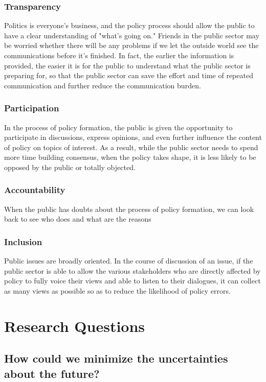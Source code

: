\documentclass{IEEEtran}
\begin{document}
\begin{enumerate}
\subsubsection{Transparency}
Politics is everyone's business, and the policy process should allow the public to have a clear understanding of "what's going on." Friends in the public sector may be worried whether there will be any problems if we let the outside world see the communications before it's finished. In fact, the earlier the information is provided, the easier it is for the public to understand what the public sector is preparing for, so that the public sector can save the effort and time of repeated communication and further reduce the communication burden. 
\subsubsection{Participation}
In the process of policy formation, the public is given the opportunity to participate in discussions, express opinions, and even further influence the content of policy on topics of interest. As a result, while the public sector needs to spend more time building consensus, when the policy takes shape, it is less likely to be opposed by the public or totally objected.  
\subsubsection{Accountability}
When the public has doubts about the process of policy formation, we can look back to see who does and what are the reasons   
\subsubsection{Inclusion}
Public issues are broadly oriented. In the course of discussion of an issue, if the public sector is able to allow the various stakeholders who are directly affected by policy to fully voice their views and able to listen to their dialogues, it can collect as many views as possible so as to reduce the likelihood of policy errors. 
\section{Research Questions}

\subsection{How could we minimize the uncertainties about the future?}


\end{enumerate}
\end{document}
